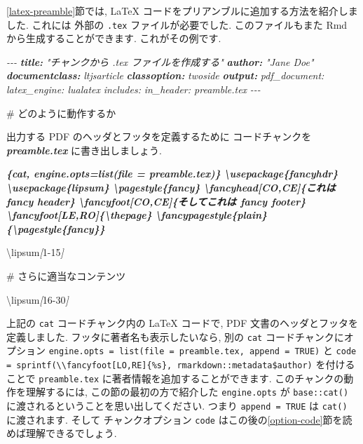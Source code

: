 \documentclass[
  11pt,
  lualatex,ja=standard,jafont=noto]{bxjsreport}
\newenvironment{Shaded}{\begin{snugshade}}{\end{snugshade}}
\newcommand{\AnnotationTok}[1]{\textcolor[rgb]{0.56,0.35,0.01}{\textbf{\textit{#1}}}}
\newcommand{\CommentTok}[1]{\textcolor[rgb]{0.56,0.35,0.01}{\textit{#1}}}
\newcommand{\FunctionTok}[1]{\textcolor[rgb]{0.00,0.00,0.00}{#1}}
\newcommand{\InformationTok}[1]{\textcolor[rgb]{0.56,0.35,0.01}{\textbf{\textit{#1}}}}
\newcommand{\NormalTok}[1]{#1}
\newcommand{\OtherTok}[1]{\textcolor[rgb]{0.56,0.35,0.01}{#1}}
\begin{document}
\ref{latex-preamble}節では, LaTeX コードをプリアンブルに追加する方法を紹介しました. これには 外部の \texttt{.tex} ファイルが必要でした. このファイルもまた Rmd から生成することができます. これがその例です.

\begin{Shaded}
\begin{Highlighting}[]
\CommentTok{{-}{-}{-}}
\AnnotationTok{title:}\CommentTok{ "チャンクから .tex ファイルを作成する"}
\AnnotationTok{author:}\CommentTok{ "Jane Doe"}
\AnnotationTok{documentclass:}\CommentTok{ ltjsarticle}
\AnnotationTok{classoption:}\CommentTok{ twoside}
\AnnotationTok{output:}\CommentTok{ }
\CommentTok{  pdf\_document:}
\CommentTok{    latex\_engine: lualatex}
\CommentTok{    includes:}
\CommentTok{      in\_header: preamble.tex}
\CommentTok{{-}{-}{-}}

\FunctionTok{\# どのように動作するか}

\NormalTok{出力する PDF のヘッダとフッタを定義するために}
\NormalTok{コードチャンクを }\InformationTok{\textasciigrave{}preamble.tex\textasciigrave{}}\NormalTok{ に書き出しましょう.}

\InformationTok{\textasciigrave{}\textasciigrave{}\textasciigrave{}\{cat, engine.opts=list(file = \textquotesingle{}preamble.tex\textquotesingle{})\}}
\InformationTok{\textbackslash{}usepackage\{fancyhdr\}}
\InformationTok{\textbackslash{}usepackage\{lipsum\}}
\InformationTok{\textbackslash{}pagestyle\{fancy\}}
\InformationTok{\textbackslash{}fancyhead[CO,CE]\{これは fancy header\}}
\InformationTok{\textbackslash{}fancyfoot[CO,CE]\{そしてこれは fancy footer\}}
\InformationTok{\textbackslash{}fancyfoot[LE,RO]\{\textbackslash{}thepage\}}
\InformationTok{\textbackslash{}fancypagestyle\{plain\}\{\textbackslash{}pagestyle\{fancy\}\}}
\InformationTok{\textasciigrave{}\textasciigrave{}\textasciigrave{}}

\NormalTok{\textbackslash{}lipsum}\CommentTok{[}\OtherTok{1{-}15}\CommentTok{]}

\FunctionTok{\# さらに適当なコンテンツ}

\NormalTok{\textbackslash{}lipsum}\CommentTok{[}\OtherTok{16{-}30}\CommentTok{]}
\end{Highlighting}
\end{Shaded}

上記の \texttt{cat} コードチャンク内の LaTeX コードで, PDF 文書のヘッダとフッタを定義しました. フッタに著者名も表示したいなら, 別の \texttt{cat} コードチャンクにオプション \texttt{engine.opts = list(file = \textquotesingle{}preamble.tex\textquotesingle{},\ append\ =\ TRUE)} と \texttt{code = sprintf(\textquotesingle{}\textbackslash{}\textbackslash{}fancyfoot{[}LO,RE{]}\{\%s\}\textquotesingle{},\ rmarkdown::metadata\$author)} を付けることで \texttt{preamble.tex} に著者情報を追加することができます. このチャンクの動作を理解するには, この節の最初の方で紹介した \texttt{engine.opts} が \texttt{base::cat()} に渡されるということを思い出してください. つまり \texttt{append = TRUE} は \texttt{cat()} に渡されます. そして チャンクオプション \texttt{code} はこの後の\ref{option-code}節を読めば理解できるでしょう.
\end{document}
